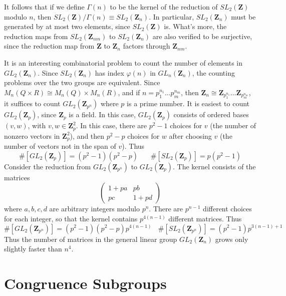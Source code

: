It follows that if we define $\Gamma(n)$ to be the kernel of the reduction of $SL_2(\mathbf{Z})$ modulo $n$, then $SL_2(\mathbf{Z})/\Gamma(n) \equiv SL_2(\mathbf{Z}_n)$. In particular, $SL_2(\mathbf{Z}_n)$ must be generated by at most two elements, since $SL_2(\mathbf{Z})$ is. What's more, the reduction maps from $SL_2(\mathbf{Z}_{nm})$ to $SL_2(\mathbf{Z}_n)$ are also verified to be surjective, since the reduction map from $\mathbf{Z}$ to $\mathbf{Z}_n$ factors through $\mathbf{Z}_{nm}$.

It is an interesting combinatorial problem to count the number of elements in $GL_2(\mathbf{Z}_n)$. Since $SL_2(\mathbf{Z}_n)$ has index $\varphi(n)$ in $GL_n(\mathbf{Z}_n)$, the counting problems over the two groups are equivalent. Since $M_n(Q \times R) \cong M_n(Q) \times M_n(R)$, and if $n = p_1^{n_1} \dots p_m^{n_m}$, then $\mathbf{Z}_n \cong \mathbf{Z}_{p_1^{n_1}} \dots \mathbf{Z}_{p_m^{n_m}}$, it suffices to count $GL_2(\mathbf{Z}_{p^n})$ where $p$ is a prime number. It is easiest to count $GL_2(\mathbf{Z}_p)$, since $\mathbf{Z}_p$ is a field. In this case, $GL_2(\mathbf{Z}_p)$ consists of ordered bases $(v,w)$, with $v,w \in \mathbf{Z}_p^2$. In this case, there are $p^2 - 1$ choices for $v$ (the number of nonzero vectors in $\mathbf{Z}_p^2$), and then $p^2 - p$ choices for $w$ after choosing $v$ (the number of vectors not in the span of $v$). Thus
%
\[ \#[GL_2(\mathbf{Z}_p)] = (p^2 - 1)(p^2 - p)\ \ \ \ \ \ \ \ \#[SL_2(\mathbf{Z}_p)] = p (p^2 - 1) \]
%
Consider the reduction from $GL_2(\mathbf{Z}_{p^n})$ to $GL_2(\mathbf{Z}_p)$. The kernel consists of the matrices
%
\[ \begin{pmatrix} 1 + pa & pb \\ pc & 1 + pd \end{pmatrix} \]
%
where $a,b,c,d$ are arbitrary integers modulo $p^n$. There are $p^{n-1}$ different choices for each integer, so that the kernel contains $p^{4(n-1)}$ different matrices. Thus
%
\[ \#[GL_2(\mathbf{Z}_{p^n})] = (p^2 - 1)(p^2 - p) p^{4(n-1)}\ \ \ \ \#[SL_2(\mathbf{Z}_{p^n})] = (p^2 - 1)p^{3(n-1) + 1} \]
%
Thus the number of matrices in the general linear group $GL_2(\mathbf{Z}_n)$ grows only slightly faster than $n^4$.

\section{Congruence Subgroups}

